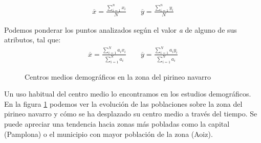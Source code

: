 \begin{itemize}
\begin{itemize}
        \begin{eqnarray}
            \overline{x} = \frac{\displaystyle \sum_{i=1}^n x_i}{N} \hspace{2em} \overline{y}= \frac{\displaystyle \sum_{i=1}^n y_i}{N} \nonumber
        \end{eqnarray}

        Podemos ponderar los puntos analizados según el valor \textit{a} de alguno de sus atributos, tal que:
        \begin{eqnarray}
            \overline{x} = \frac{\displaystyle\sum_{i=1}^N a_i x_i}{\displaystyle\sum_{i=1}^N a_i} \hspace{2em} \overline{y} = \frac{\displaystyle\sum_{i=1}^N a_i y_i}{\displaystyle\sum_{i=1}^N a_i} \nonumber
        \end{eqnarray}

        \begin{figure}[H]
            \centering
            \captionsetup[subfigure]{labelformat=empty}
            \caption{Centros medios demográficos en la zona del pirineo navarro} \label{fig:centros-medios} 
        \end{figure} 

        Un uso habitual del centro medio lo encontramos en los estudios demográficos.
        En la figura \ref{fig:centros-medios} podemos ver la evolución de las poblaciones sobre la zona del pirineo navarro y cómo se ha desplazado su centro medio a través del tiempo.
        Se puede apreciar una tendencia hacia zonas más pobladas como la capital (Pamplona) o el municipio con mayor población de la zona (Aoiz).


\end{itemize}
\end{itemize}
